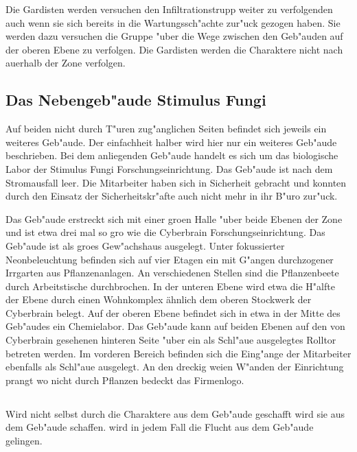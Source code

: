Die Gardisten werden versuchen den Infiltrationstrupp weiter zu verfolgenden auch wenn sie sich bereits in die Wartungssch"achte zur"uck gezogen haben. Sie werden dazu versuchen die Gruppe "uber die Wege zwischen den Geb"auden auf der oberen Ebene zu verfolgen. Die Gardisten werden die Charaktere nicht nach au\3erhalb der Zone verfolgen.

\subsection{Das Nebengeb"aude Stimulus Fungi} 
Auf beiden nicht durch T"uren zug"anglichen Seiten befindet sich jeweils ein weiteres Geb"aude. Der einfachheit halber wird hier nur ein weiteres Geb"aude beschrieben. Bei dem anliegenden Geb"aude handelt es sich um das biologische Labor der Stimulus Fungi Forschungseinrichtung. Das Geb"aude ist nach dem Stromausfall leer. Die Mitarbeiter haben sich in Sicherheit gebracht und konnten durch den Einsatz der Sicherheitskr"afte auch nicht mehr in ihr B"uro zur"uck. 

Das Geb"aude erstreckt sich mit einer gro\3en Halle "uber beide Ebenen der Zone und ist etwa drei mal so gro\3 wie die Cyberbrain Forschungseinrichtung. Das Geb"aude ist als gro\3es Gew"achshaus ausgelegt. Unter fokussierter Neonbeleuchtung befinden sich auf vier Etagen ein mit G"angen durchzogener Irrgarten aus Pflanzenanlagen. An verschiedenen Stellen sind die Pflanzenbeete durch Arbeitstische durchbrochen. In der unteren Ebene wird etwa die H"alfte der Ebene durch einen Wohnkomplex ähnlich dem oberen Stockwerk der Cyberbrain belegt. Auf der oberen Ebene befindet sich in etwa in der Mitte des Geb"audes ein Chemielabor. Das Geb"aude kann auf beiden Ebenen auf den von Cyberbrain gesehenen hinteren Seite "uber ein als Schl"au\3e ausgelegtes Rolltor betreten werden. Im vorderen Bereich befinden sich die Eing"ange der Mitarbeiter ebenfalls als Schl"au\3e ausgelegt. An den dreckig wei\3en W"anden der Einrichtung prangt wo nicht durch Pflanzen bedeckt das Firmenlogo.

\subsection{\ml{}} 
Wird \ml{} nicht selbst durch die Charaktere aus dem Geb"aude geschafft wird \xl{} sie aus dem Geb"aude schaffen. \ml{} wird in jedem Fall die Flucht aus dem Geb"aude gelingen.

%
%

